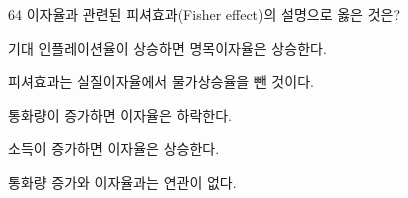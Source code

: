 \begin{question}{64}
이자율과 관련된 피셔효과(Fisher effect)의 설명으로 옳은 것은?
\begin{choices}
  \item 기대 인플레이션율이 상승하면 명목이자율은 상승한다.
  \item 피셔효과는 실질이자율에서 물가상승율을 뺀 것이다.
  \item 통화량이 증가하면 이자율은 하락한다.
  \item 소득이 증가하면 이자율은 상승한다.
  \item 통화량 증가와 이자율과는 연관이 없다.
\end{choices}
\end{question}
